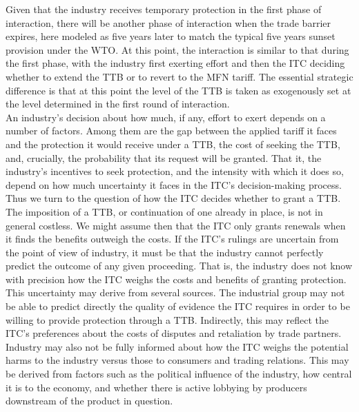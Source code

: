 \documentclass[12pt]{article}
\begin{document}
Given that the industry receives temporary protection in the first phase of interaction, there will be another phase of interaction when the trade barrier expires, here modeled as five years later to match the typical five years sunset provision under the WTO. At this point, the interaction is similar to that during the first phase, with the industry first exerting effort and then the ITC deciding whether to extend the TTB or to revert to the MFN tariff. The essential strategic difference is that at this point the level of the TTB is taken as exogenously set at the level determined in the first round of interaction. \\

An industry's decision about how much, if any, effort to exert depends on a number of factors. Among them are the gap between the applied tariff it faces and the protection it would receive under a TTB, the cost of seeking the TTB, and, crucially, the probability that its request will be granted. That it, the industry's incentives to seek protection, and the intensity with which it does so, depend on how much uncertainty it faces in the ITC's decision-making process. \\
 
Thus we turn to the question of how the ITC decides whether to grant a TTB. The imposition of a TTB, or continuation of one already in place, is not in general costless. We might assume then that the ITC only grants renewals when it finds the benefits outweigh the costs. If the ITC's rulings are uncertain from the point of view of industry, it must be that the industry cannot perfectly predict the outcome of any given proceeding. That is, the industry does not know with precision how the ITC weighs the costs and benefits of granting protection.\\

This uncertainty may derive from several sources. The industrial group may not be able to predict directly the quality of evidence the ITC requires in order to be willing to provide protection through a TTB. Indirectly, this may reflect the ITC's preferences about the costs of disputes and retaliation by trade partners. Industry may also not be fully informed about how the ITC weighs the potential harms to the industry versus those to consumers and trading relations. This may be derived from factors such as the political influence of the industry, how central it is to the economy, and whether there is active lobbying by producers downstream of the product in question.
\end{document}
